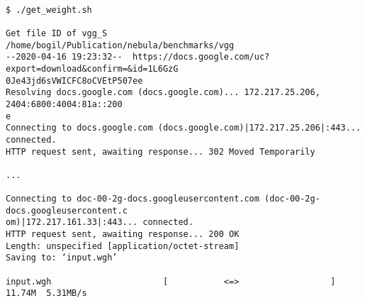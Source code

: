 \documentclass[10pt]{article}
\begin{document}
\begin{Verbatim}[frame=single,fontsize=\small]

$ ./get_weight.sh

Get file ID of vgg_S
/home/bogil/Publication/nebula/benchmarks/vgg
--2020-04-16 19:23:32--  https://docs.google.com/uc?export=download&confirm=&id=1L6GzG
0Je43jd6sVWICFC8oCVEtP507ee
Resolving docs.google.com (docs.google.com)... 172.217.25.206, 2404:6800:4004:81a::200
e
Connecting to docs.google.com (docs.google.com)|172.217.25.206|:443... connected.
HTTP request sent, awaiting response... 302 Moved Temporarily

...

Connecting to doc-00-2g-docs.googleusercontent.com (doc-00-2g-docs.googleusercontent.c
om)|172.217.161.33|:443... connected.
HTTP request sent, awaiting response... 200 OK
Length: unspecified [application/octet-stream]
Saving to: ‘input.wgh’

input.wgh                      [           <=>                  ]  11.74M  5.31MB/s

\end{Verbatim}
\end{document}
